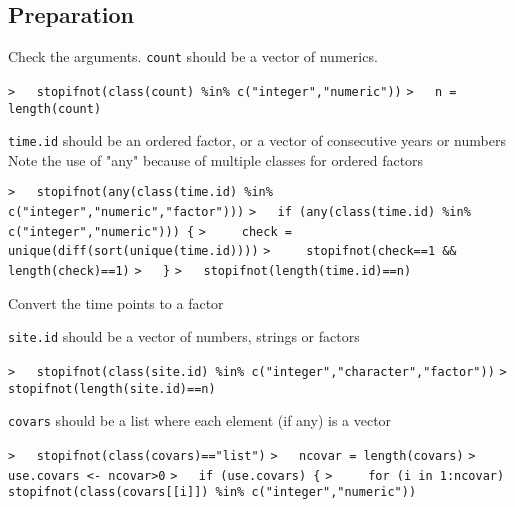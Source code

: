 \documentclass[a4paper]{article}
\begin{document}
\subsection{Preparation}\par

Check the arguments. \verb!count! should be a vector of numerics.\par
\verb~>   stopifnot(class(count) %in% c("integer","numeric"))~\newline
\verb~>   n = length(count)~\par

\verb!time.id! should be an ordered factor, or a vector of consecutive years or numbers
Note the use of "any" because of multiple classes for ordered factors\par
\verb~>   stopifnot(any(class(time.id) %in% c("integer","numeric","factor")))~\newline
\verb~>   if (any(class(time.id) %in% c("integer","numeric"))) {~\newline
\verb~>     check = unique(diff(sort(unique(time.id))))~\newline
\verb~>     stopifnot(check==1 && length(check)==1)~\newline
\verb~>   }~\newline
\verb~>   stopifnot(length(time.id)==n)~\par
Convert the time points to a factor\par

\verb!site.id! should be a vector of numbers, strings or factors\par
\verb~>   stopifnot(class(site.id) %in% c("integer","character","factor"))~\newline
\verb~>   stopifnot(length(site.id)==n)~\par

\verb!covars! should be a list where each element (if any) is a vector\par
\verb~>   stopifnot(class(covars)=="list")~\newline
\verb~>   ncovar = length(covars)~\newline
\verb~>   use.covars <- ncovar>0~\newline
\verb~>   if (use.covars) {~\newline
\verb~>     for (i in 1:ncovar) stopifnot(class(covars[[i]]) %in% c("integer","numeric"))~\par
\end{document}
